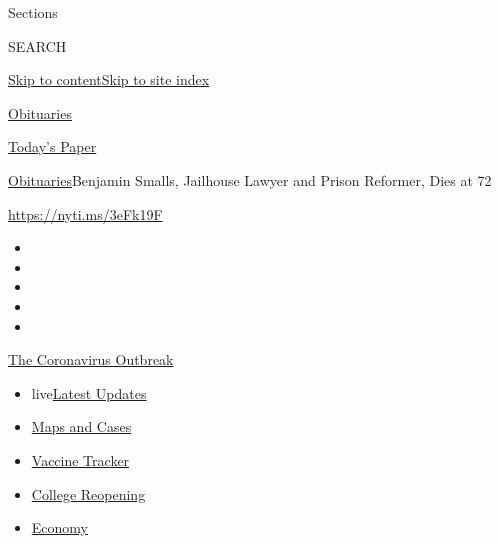 Sections

SEARCH

\protect\hyperlink{site-content}{Skip to
content}\protect\hyperlink{site-index}{Skip to site index}

\href{https://www.nytimes3xbfgragh.onion/section/obituaries}{Obituaries}

\href{https://myaccount.nytimes3xbfgragh.onion/auth/login?response_type=cookie\&client_id=vi}{}

\href{https://www.nytimes3xbfgragh.onion/section/todayspaper}{Today's
Paper}

\href{/section/obituaries}{Obituaries}\textbar{}Benjamin Smalls,
Jailhouse Lawyer and Prison Reformer, Dies at 72

\url{https://nyti.ms/3eFk19F}

\begin{itemize}
\item
\item
\item
\item
\item
\end{itemize}

\href{https://www.nytimes3xbfgragh.onion/news-event/coronavirus?action=click\&pgtype=Article\&state=default\&region=TOP_BANNER\&context=storylines_menu}{The
Coronavirus Outbreak}

\begin{itemize}
\tightlist
\item
  live\href{https://www.nytimes3xbfgragh.onion/2020/08/04/world/coronavirus-covid-19.html?action=click\&pgtype=Article\&state=default\&region=TOP_BANNER\&context=storylines_menu}{Latest
  Updates}
\item
  \href{https://www.nytimes3xbfgragh.onion/interactive/2020/us/coronavirus-us-cases.html?action=click\&pgtype=Article\&state=default\&region=TOP_BANNER\&context=storylines_menu}{Maps
  and Cases}
\item
  \href{https://www.nytimes3xbfgragh.onion/interactive/2020/science/coronavirus-vaccine-tracker.html?action=click\&pgtype=Article\&state=default\&region=TOP_BANNER\&context=storylines_menu}{Vaccine
  Tracker}
\item
  \href{https://www.nytimes3xbfgragh.onion/2020/08/02/us/covid-college-reopening.html?action=click\&pgtype=Article\&state=default\&region=TOP_BANNER\&context=storylines_menu}{College
  Reopening}
\item
  \href{https://www.nytimes3xbfgragh.onion/live/2020/08/03/business/stock-market-today-coronavirus?action=click\&pgtype=Article\&state=default\&region=TOP_BANNER\&context=storylines_menu}{Economy}
\end{itemize}

